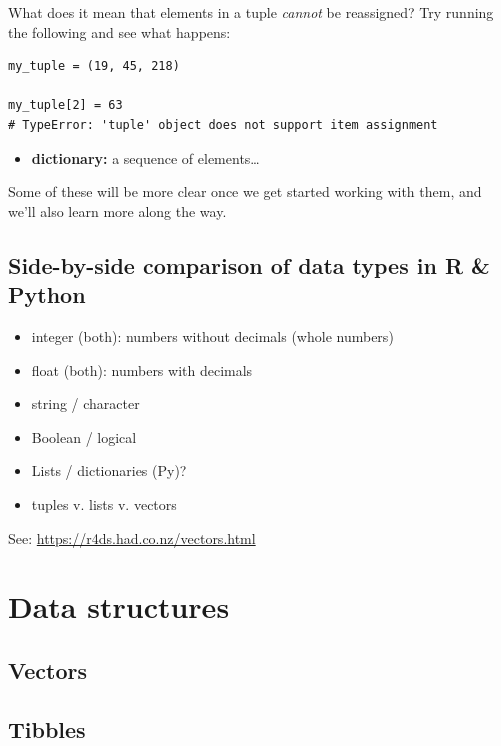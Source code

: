 \documentclass[
]{book}
\providecommand{\tightlist}{%
  \setlength{\itemsep}{0pt}\setlength{\parskip}{0pt}}
\begin{document}
What does it mean that elements in a tuple \emph{cannot} be reassigned? Try running the following and see what happens:

\begin{verbatim}
my_tuple = (19, 45, 218)

my_tuple[2] = 63
# TypeError: 'tuple' object does not support item assignment
\end{verbatim}

\begin{itemize}
\tightlist
\item
  \textbf{dictionary:} a sequence of elements\ldots{}
\end{itemize}

Some of these will be more clear once we get started working with them, and we'll also learn more along the way.

\hypertarget{side-by-side-comparison-of-data-types-in-r-python}{%
\subsection{Side-by-side comparison of data types in R \& Python}\label{side-by-side-comparison-of-data-types-in-r-python}}

\begin{itemize}
\tightlist
\item
  integer (both): numbers without decimals (whole numbers)
\item
  float (both): numbers with decimals
\item
  string / character
\item
  Boolean / logical
\item
  Lists / dictionaries (Py)?
\item
  tuples v. lists v. vectors
\end{itemize}

See: \url{https://r4ds.had.co.nz/vectors.html}

\hypertarget{data-structures}{%
\section{Data structures}\label{data-structures}}

\hypertarget{vectors}{%
\subsection{Vectors}\label{vectors}}

\hypertarget{tibbles}{%
\subsection{Tibbles}\label{tibbles}}
\end{document}
